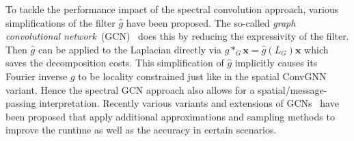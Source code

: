 \documentclass[12pt]{scrartcl}
\begin{document}
\begin{enumerate}[label=\textbf{\arabic*.}]
\begin{enumerate}[label=\textbf{\alph*)}]
				To tackle the performance impact of the spectral convolution approach, various simplifications of the filter $\hat{g}$ have been proposed.
				The so-called \textit{graph convolutional network}~(GCN)~\cite{Kipf2017} does this by reducing the expressivity of the filter.
				Then $\hat{g}$ can be applied to the Laplacian directly via $g *_G \bm{x} = \hat{g}(L_G) \bm{x}$ which saves the decomposition costs.
				This simplification of $\hat{g}$ implicitly causes its Fourier inverse $g$ to be locality constrained just like in the spatial ConvGNN variant.
				Hence the spectral GCN approach also allows for a spatial/message-passing interpretation.
				Recently various variants and extensions of GCNs~\cite{Hamilton2017}\cite{Chen2018}\cite{Chen2017}\cite{Chiang2019}\cite{Du2017} have been proposed that apply additional approximations and sampling methods to improve the runtime as well as the accuracy in certain scenarios.


\end{enumerate}
\end{enumerate}
\end{document}

